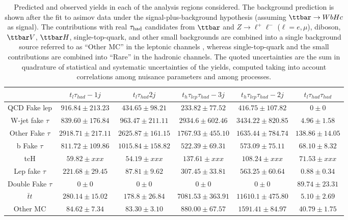 \begin{table}[htbp]
\caption{
Predicted and observed yields in each of the analysis regions considered.
The background prediction is shown after the fit to asimov data under the signal-plus-background hypothesis 
(assuming $\Hc$ as signal).
The contributions with real $\tau_{\mathrm{had}}$ candidates from $\ttbar$ and  $Z\to \ell^+\ell^-$ ($\ell = e, \mu$), diboson, $\ttbar V$, $\ttbar H$, single-top-quark, and other small backgrounds are combined into
a single background source referred to as ``Other MC'' in the leptonic channels , whereas single-top-quark and the small contributions are combined into ``Rare'' in the hadronic channels.
The quoted uncertainties are the sum in quadrature of statistical and systematic uncertainties of the yields, 
computed taking into account correlations among nuisance parameters and among processes.}
\small
\centering
\begin{tabular}{|c|c|c|c|c|c|}\hline 
  & $t_{l}\tau_{had}-1j$ & $t_{l}\tau_{had}2j$ & $t_{h}\tau_{lep}\tau_{had}-3j$ & $t_{h}\tau_{lep}\tau_{had}-2j$ & $t_{l}\tau_{had}\tau_{had}$\\\hline 
  QCD Fake lep   & $916.84 \pm 213.23$ & $434.65 \pm 98.21$ & $233.82 \pm 77.52$ & $416.75 \pm 107.82$ & $0 \pm 0$ \\ 
  W-jet fake $\tau$  & $839.60 \pm 176.84$ & $963.47 \pm 211.11$ & $2934.6 \pm 602.46$ & $3434.22 \pm 820.85$ & $4.96 \pm 1.58$ \\ 
  Other Fake $\tau$  & $2918.71 \pm 217.11$ & $2625.87 \pm 161.15$ & $1767.93 \pm 455.10$ & $1635.44 \pm 784.74$ & $138.86 \pm 14.05$ \\ 
  b Fake $\tau$  & $811.72 \pm 109.86$ & $1015.84 \pm 158.82$ & $522.39 \pm 69.31$ & $573.09 \pm 75.11$ & $68.10 \pm 8.32$ \\ 
    tcH   & $59.82 \pm xxx$ & $54.19 \pm xxx$ & $137.61 \pm xxx$ & $108.24 \pm xxx$ & $71.53 \pm xxx$ \\ 
  Lep fake $\tau$  & $221.68 \pm 29.45$ & $87.81 \pm 9.62$ & $307.45 \pm 33.81$ & $563.25 \pm 60.64$ & $0.88 \pm 0.34$ \\ 
  Double Fake $\tau$  & $0 \pm 0$ & $0 \pm 0$ & $0 \pm 0$ & $0 \pm 0$ & $89.74 \pm 23.31$ \\ 
  $\bar{t}t$   & $280.14 \pm 15.02$ & $178.8 \pm 26.84$ & $7081.53 \pm 363.91$ & $11610.1 \pm 475.80$ & $5.10 \pm 2.69$ \\ 
  Other MC   & $84.62 \pm 7.34$ & $83.30 \pm 3.10$ & $880.00 \pm 67.57$ & $1591.41 \pm 84.97$ & $40.79 \pm 1.75$ \\ 

\end{tabular}
\end{table}
